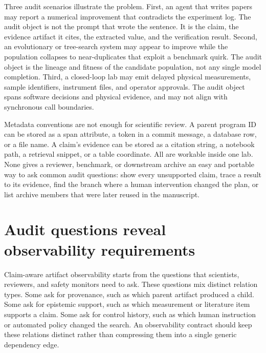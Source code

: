\documentclass{article}
\begin{document}
Three audit scenarios illustrate the problem. First, an agent that writes papers may report a numerical improvement that contradicts the experiment log. The audit object is not the prompt that wrote the sentence. It is the claim, the evidence artifact it cites, the extracted value, and the verification result. Second, an evolutionary or tree-search system may appear to improve while the population collapses to near-duplicates that exploit a benchmark quirk. The audit object is the lineage and fitness of the candidate population, not any single model completion. Third, a closed-loop lab may emit delayed physical measurements, sample identifiers, instrument files, and operator approvals. The audit object spans software decisions and physical evidence, and may not align with synchronous call boundaries.

Metadata conventions are not enough for scientific review. A parent program ID can be stored as a span attribute, a token in a commit message, a database row, or a file name. A claim's evidence can be stored as a citation string, a notebook path, a retrieval snippet, or a table coordinate. All are workable inside one lab. None gives a reviewer, benchmark, or downstream archive an easy and portable way to ask common audit questions: show every unsupported claim, trace a result to its evidence, find the branch where a human intervention changed the plan, or list archive members that were later reused in the manuscript.

\section{Audit questions reveal observability requirements}

Claim-aware artifact observability starts from the questions that scientists, reviewers, and safety monitors need to ask. These questions mix distinct relation types. Some ask for provenance, such as which parent artifact produced a child. Some ask for epistemic support, such as which measurement or literature item supports a claim. Some ask for control history, such as which human instruction or automated policy changed the search. An observability contract should keep these relations distinct rather than compressing them into a single generic dependency edge.
\end{document}
